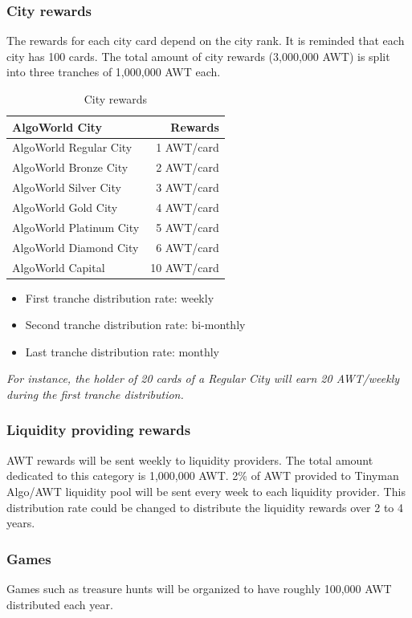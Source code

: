 \documentclass{article}
\begin{document}
\subsubsection{City rewards}
\label{CR}
The rewards for each city card depend on the city rank. It is reminded that each city has 100 cards. The total amount of city rewards (3,000,000 AWT) is split into three tranches of 1,000,000 AWT each.
\begin{table}[ht]
\centering
\begin{tabular}{l|r}
AlgoWorld City & Rewards \\\hline
AlgoWorld Regular City & 1 AWT/card \\
AlgoWorld Bronze City & 2 AWT/card \\
AlgoWorld Silver City & 3 AWT/card \\
AlgoWorld Gold City & 4 AWT/card \\
AlgoWorld Platinum City & 5 AWT/card \\
AlgoWorld Diamond City & 6 AWT/card \\
AlgoWorld Capital & 10 AWT/card \\
\end{tabular}
\caption{\label{tab:widgets}City rewards}
\end{table}

\begin{itemize}
\item First tranche distribution rate: weekly
\item Second tranche distribution rate: bi-monthly
\item Last tranche distribution rate: monthly
\end{itemize}

\textit{For instance, the holder of 20 cards of a Regular City will earn 20 AWT/weekly during the first tranche distribution.}

\subsubsection{Liquidity providing rewards}

AWT rewards will be sent weekly to liquidity providers. The total amount dedicated to this category is 1,000,000 AWT.
2\% of AWT provided to Tinyman Algo/AWT liquidity pool will be sent every week to each liquidity provider. This distribution rate could be changed to distribute the liquidity rewards over 2 to 4 years.

\subsubsection{Games}
Games such as treasure hunts will be organized to have roughly 100,000 AWT distributed each year.
\end{document}
